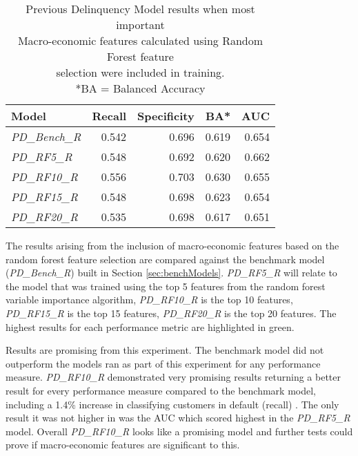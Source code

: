 \begin{table}[H]
\centering
\small
		\begin{tabular}{l r r r r}
			\hline
			\textbf{Model} & \textbf{Recall} & \textbf{Specificity} & \textbf{BA*} & \textbf{AUC}  \\ \hline
			\textit{PD\_Bench\_R} & 0.542 & 0.696 & 0.619 & 0.654 \\ \hline
			\textit{PD\_RF5\_R} & 0.548 & 0.692 & 0.620 & \cellcolor{green!25}0.662   \\ 
			\textit{PD\_RF10\_R} & \cellcolor{green!25}0.556 & \cellcolor{green!25}0.703 & \cellcolor{green!25}0.630 & 0.655  \\ 
			\textit{PD\_RF15\_R} & 0.548 & 0.698 & 0.623 & 0.654  \\
			\textit{PD\_RF20\_R} & 0.535 & 0.698 & 0.617 & 0.651  \\\hline 
		\end{tabular}

	\caption{Previous Delinquency Model results when most important\\
Macro-economic features calculated using Random Forest feature \\selection were included in training.
\\ *BA = Balanced Accuracy}
	\label{table:RFPDModelResults}
\end{table}

The results arising from the inclusion of macro-economic features based on the random forest feature selection are compared against the benchmark model (\textit{PD\_Bench\_R}) built in Section \ref{sec:benchModels}. \textit{PD\_RF5\_R} will relate to the model that was trained using the top 5 features from the random forest variable importance algorithm, \textit{PD\_RF10\_R} is the top 10 features, \textit{PD\_RF15\_R} is the top 15 features, \textit{PD\_RF20\_R} is the top 20 features. The highest results for each performance metric are highlighted in green.

Results are promising from this experiment. The benchmark model did not outperform the models ran as part of this experiment for any performance measure. \textit{PD\_RF10\_R} demonstrated  very promising results returning a better result for every performance measure compared to the benchmark model, including a 1.4\% increase in classifying customers in default (recall) . The only result it was not higher in was the AUC which scored highest in the \textit{PD\_RF5\_R} model. Overall \textit{PD\_RF10\_R} looks like a promising model and further tests could prove if macro-economic features are significant to this.

